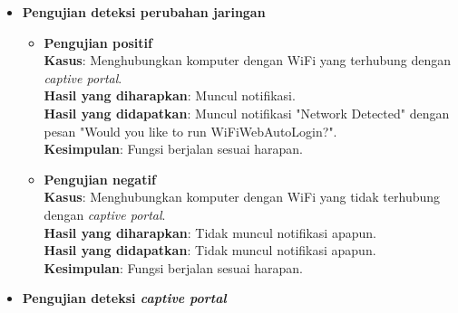 \begin{itemize}
    \item{
        \textbf{Pengujian deteksi perubahan jaringan}
        
        \begin{itemize}
            \item{
                \textbf{Pengujian positif}\\
                \textbf{Kasus}: Menghubungkan komputer dengan WiFi yang terhubung dengan \textit{captive portal}.\\
                \textbf{Hasil yang diharapkan}: Muncul notifikasi.\\
                \textbf{Hasil yang didapatkan}: Muncul notifikasi "Network Detected" dengan pesan "Would you like to run WiFiWebAutoLogin?".\\
                \textbf{Kesimpulan}: Fungsi berjalan sesuai harapan.
            }
            \item{
                \textbf{Pengujian negatif}\\
                \textbf{Kasus}: Menghubungkan komputer dengan WiFi yang tidak terhubung dengan \textit{captive portal}.\\
                \textbf{Hasil yang diharapkan}: Tidak muncul notifikasi apapun.\\
                \textbf{Hasil yang didapatkan}: Tidak muncul notifikasi apapun.\\
                \textbf{Kesimpulan}: Fungsi berjalan sesuai harapan.
            }
        \end{itemize}
    }
    \item{
        \textbf{Pengujian deteksi \textit{captive portal}}
        
}
\end{itemize}
